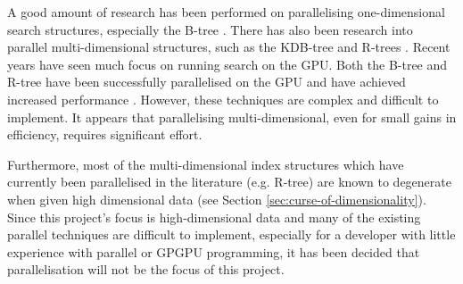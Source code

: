 A good amount of research has been performed on parallelising one-dimensional search structures, especially the B-tree \cite{btree-gpu1, btree-gpu2, btree-gpu3, fat-btree, multidisk-btree, parallel-btree}. There has also been research into parallel multi-dimensional structures, such as the KDB-tree \cite{traversing-spatial-indexes-gpu} and R-trees \cite{master-client-rtree, parallel-rtree, rtree-gpu1, rtree-gpu2}. Recent years have seen much focus on running search on the GPU. Both the B-tree and R-tree have been successfully parallelised on the GPU and have achieved increased performance \cite{btree-gpu2, rtree-gpu1}. However, these techniques are complex and difficult to implement. It appears that parallelising multi-dimensional, even for small gains in efficiency, requires significant effort.

Furthermore, most of the multi-dimensional index structures which have currently been parallelised in the literature (e.g. R-tree) are known to degenerate when given high dimensional data (see Section \ref{sec:curse-of-dimensionality}). Since this project's focus is high-dimensional data and many of the existing parallel techniques are difficult to implement, especially for a developer with little experience with parallel or GPGPU programming, it has been decided that parallelisation will not be the focus of this project.
